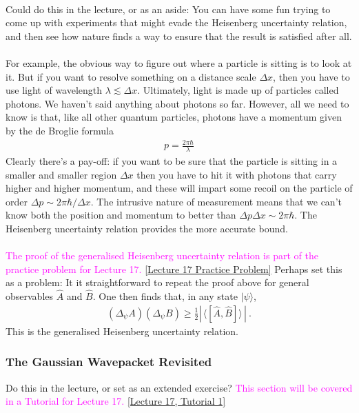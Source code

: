 \documentclass[12pt]{article}
\def\be{\begin{eqnarray}}
\def\ee{\end{eqnarray}}
\newcommand{\nn}{\nonumber}
\newcommand\para{\paragraph{}}
\newcommand{\ket}[1]{|#1\rangle}
\newcommand{\cblue}{\color{blue}}
\newcommand{\alyssa}{\textcolor{magenta}}
\begin{document}
{ \para
 {\cblue Could do this in the lecture, or as an aside:}
 You can have some fun trying to come up with experiments that might evade the Heisenberg uncertainty relation, and then see how nature finds a way to  ensure that the result is satisfied after all. 
 
 \para
 For example, the obvious way to figure out where a particle is sitting is to look at it. But if you want to resolve something on a distance scale $\Delta x$, then you have to use light of wavelength $\lambda \lesssim \Delta x$.
 Ultimately, light is made up of particles called photons. We haven't said anything about photons so far.  However, all we need to know is that, like all other quantum particles, photons have a momentum given by the de Broglie formula 
 \be p = \frac{2\pi\hbar}{\lambda}\nn\ee
 Clearly there's a pay-off: if you want to be sure that the particle is sitting in a smaller and smaller region $\Delta x$ then you have to hit it with photons that carry higher and higher momentum, and these will impart some recoil on the particle of order  $\Delta p \sim 2\pi\hbar/ \Delta x$. The intrusive nature of measurement means that we can't  know both the position and momentum to better than  $\Delta p \Delta x \sim 2\pi \hbar$. The Heisenberg uncertainty relation provides the more accurate bound.

 


\para
\alyssa{The proof of the generalised Heisenberg uncertainty relation is part of the practice problem for Lecture 17.} \href{https://drive.google.com/file/d/1RcCfNfrKIEmnRbL_AyJe6mOLPKukT4Fm/view?usp=drive_link}{[Lecture 17 Practice Problem]}
{\cblue Perhaps set this as a problem: It it straightforward to repeat the proof above for general observables $\hat{A}$ and $\hat{B}$. One then finds that, in any state $\ket{\psi}$, 
%
\be (\Delta_\psi A)(\Delta_\psi B) \geq \frac{1}{2}|\,\langle [\hat{A},\hat{B}]\rangle\,|\ .\nn\ee
%
This is the generalised Heisenberg uncertainty relation. }
 
\subsubsection*{The Gaussian Wavepacket Revisited}

{\cblue Do this in the lecture, or set as an extended exercise?} \alyssa{This section will be covered in a Tutorial for Lecture 17.} \href{https://drive.google.com/file/d/1So8tapOEUkljUpnU8ERyn7qTcuPAARaS/view?usp=drive_link}{[Lecture 17, Tutorial 1]}

}
\end{document}
